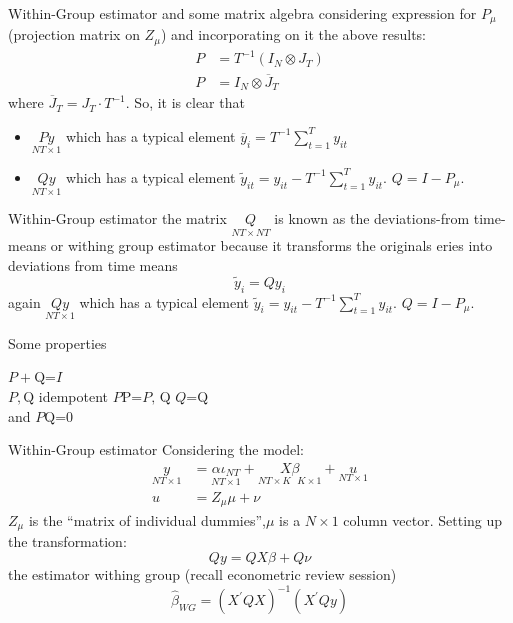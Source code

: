 \begin{frame}{Within-Group estimator and some matrix algebra}	
	considering expression for $P_{\mu }$ (projection matrix on $Z_{\mu }$) and incorporating on it the above results: 
		\begin{align*}
			P & = T^{-1}\left(I_{N}\otimes J_{T}\right) \\
			P & = I_{N}\otimes \overline{J}_{T}
		\end{align*}
	where $\overline{J}_{T} = J_{T} \cdot T^{-1}.$ So, it is clear that
		\begin{itemize}
			\item $\underset{NT\times 1}{Py}$ which has a typical element $\overline{y}_{i}=T^{-1}\sum_{t=1}^{T}y_{it}$ \pause
			\item $\underset{NT\times 1}{Qy}$ which has a typical element $\widetilde{y}_{it}=y_{it}-T^{-1}\sum_{t=1}^{T}y_{it}.$ $Q=I-P_{\mu}.$
		\end{itemize}
\end{frame}
\begin{frame}{Within-Group estimator}
	the matrix $\underset{NT\times NT}{Q}$ is known as the deviations-from time-means or withing group estimator because it transforms the originals eries into deviations from time means
		$$\widetilde{y}_{i}=Qy_{i}$$
	again $\underset{NT\times 1}{Qy}$ which has a typical element $\widetilde{y}_{i}=y_{it}-T^{-1}\sum_{t=1}^{T}y_{it}.$ $Q=I-P_{\mu }.$
	    \begin{block}{Some properties}
			\begin{center}
				$P+$Q=$I$ \\
				$P,$Q idempotent $P$P=$P,\, $Q $Q$=Q \\
				and $P$Q=0
			\end{center}
		\end{block}
\end{frame}
\begin{frame}{Within-Group estimator}
	Considering the model:
		\begin{align*}
			\underset{NT\times 1}{y} & = \underset{NT\times 1}{\alpha \iota _{NT}}+\underset{NT\times K\text{ }K\times 1}{X\beta }+\underset{NT\times 1}{u} \\
			u & =Z_{\mu }\mu +\nu
		\end{align*}
	$Z_{\mu }$ is the ``matrix of individual dummies'',$\mu $ is a $N\times 1$ column vector. Setting up the transformation:
		$$Qy=QX\beta +Q\nu$$
	the estimator withing group (recall econometric review session) 
		$$\widehat{\beta}_{WG}=\left(X^{\prime }QX\right)^{-1}\left(X^{\prime}Qy\right)$$
\end{frame}
